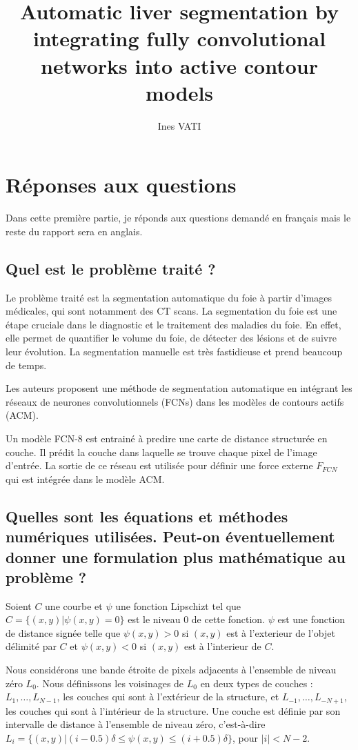 \documentclass[a4paper, 11pt]{article}
\title{Automatic liver segmentation by integrating fully convolutional networks into active contour models}
\author[1, 2]{Ines VATI}
\affil[1]{École des Ponts ParisTech, Champs-sur-Marne, France}
\affil[2]{MVA, ENS Paris-Saclay, Cachan, France}
\affil[1, 2]{Email \email{ines.vati@eleves.enpc.fr}}
\date{}
\begin{document}
\maketitle

\section{Réponses aux questions}

Dans cette première partie, je réponds aux questions demandé en français mais le reste du rapport sera en anglais.

\subsection{Quel est le problème traité ?}
Le problème traité est la segmentation automatique du foie à partir d'images médicales, qui sont notamment des CT scans. La segmentation du foie est une étape cruciale dans le diagnostic et le traitement des maladies du foie. En effet, elle permet de quantifier le volume du foie, de détecter des lésions et de suivre leur évolution. La segmentation manuelle est très fastidieuse et prend beaucoup de temps. 

Les auteurs proposent une méthode de segmentation automatique en intégrant les réseaux de neurones convolutionnels (FCNs) dans les modèles de contours actifs (ACM). 

Un modèle FCN-$8$ est entrainé à predire une carte de distance structurée en couche. Il prédit la couche dans laquelle se trouve chaque pixel de l'image d'entrée. La sortie de ce réseau est utilisée pour définir une force externe $F_{FCN}$ qui est intégrée dans le modèle ACM.  

\subsection{Quelles sont les équations et méthodes numériques utilisées. Peut-on éventuellement donner une formulation plus mathématique au problème ?}

Soient $C$ une courbe et $\psi$ une fonction Lipschizt tel que 
$C = \{(x, y) | \psi(x, y) = 0\}$ est le niveau 0 de cette fonction. $\psi$ est une fonction de distance signée telle que $\psi(x, y) > 0$ 
si $(x, y)$ est à l'exterieur de l'objet délimité par $C$ et $\psi(x, y) < 0$ si $(x, y)$ est à l'interieur de $C$.

Nous considérons une bande étroite de pixels adjacents à l'ensemble de niveau zéro $L_0$. Nous définissons les voisinages de $L_0$ en deux types de couches : $L_1, \dots, L_{N-1}$, les couches qui sont à l'extérieur de la structure, et $L_{-1}, \dots, L_{-N+1}$, les couches qui sont à l'intérieur de la structure. Une couche est définie par son intervalle de distance à l'ensemble de niveau zéro, c'est-à-dire
$L_i = \lbrace (x, y) | (i - 0.5)\delta \leq \psi(x, y) \leq (i + 0.5) \delta \rbrace$, pour $|i|<N-2$. 
\end{document}
